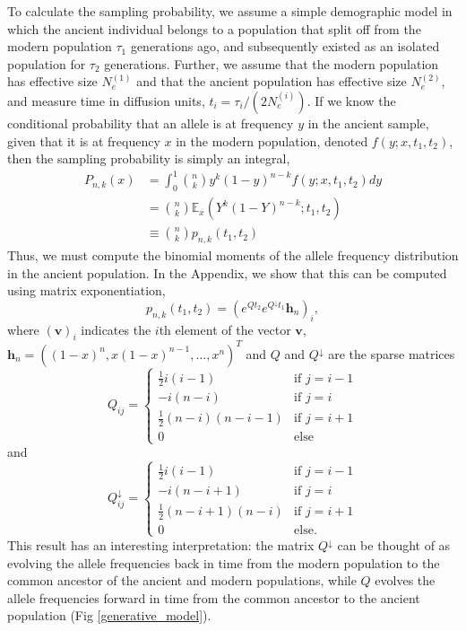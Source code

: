 \documentclass[11pt, oneside]{article}   	%
\begin{document}
To calculate the sampling probability, we assume a simple demographic model in which the ancient individual belongs to a population that split off from the modern population $\tau_1$ generations ago, and subsequently existed as an isolated population for $\tau_2$ generations. Further, we assume that the modern population has effective size $N_e^{(1)}$ and that the ancient population has effective size $N_e^{(2)}$, and measure time in diffusion units, $t_i = \tau_i/(2N_e^{(i)})$. If we know the conditional probability that an allele is at frequency $y$ in the ancient sample, given that it is at frequency $x$ in the modern population, denoted $f(y; x, t_1, t_2)$, then the sampling probability is simply an integral,
\begin{align}
P_{n,k}(x) &= \int_0^1 \binom{n}{k}y^k(1-y)^{n-k}f(y; x, t_1, t_2)dy \nonumber \\
&= \binom{n}{k}\mathbb{E}_x\left(Y^k(1-Y)^{n-k}; t_1, t_2 \right) \nonumber \\
&\equiv \binom{n}{k}p_{n,k}(t_1,t_2)
\end{align}
Thus, we must compute the binomial moments of the allele frequency distribution in the ancient population. In the Appendix, we show that this can be computed using matrix exponentiation, 
\begin{equation}
p_{n,k}(t_1,t_2) = \left(e^{Q t_2}e^{Q^\downarrow t_1}\mathbf{h}_n \right)_i,
\label{expectation_matrices}
\end{equation}
where $(\mathbf{v})_i$ indicates the $i$th element of the vector $\mathbf{v}$, $\mathbf{h}_n = ((1-x)^n, x(1-x)^{n-1},\ldots, x^n)^T$ and $Q$ and $Q^\downarrow$ are the sparse matrices
\[
Q_{ij} = \begin{cases}
\frac{1}{2}i(i-1) & \text{if } j = i - 1 \\
-i(n-i) & \text{if } j = i \\
\frac{1}{2}(n-i)(n-i-1) & \text{if } j = i + 1 \\
0 & \text{else}
\end{cases}
\]
and
\[
Q^\downarrow_{ij} = \begin{cases}
\frac{1}{2}i(i-1) & \text{if } j = i -1 \\
-i(n-i+1) & \text{if } j = i \\
\frac{1}{2}(n-i+1)(n-i) &\text{if } j = i + 1 \\
0 & \text{else}.
\end{cases}
\]
This result has an interesting interpretation: the matrix $Q^\downarrow$ can be thought of as evolving the allele frequencies back in time from the modern population to the common ancestor of the ancient and modern populations, while $Q$ evolves the allele frequencies forward in time from the common ancestor to the ancient population (Fig \ref{generative_model}).
\end{document}
